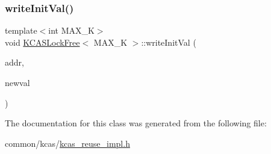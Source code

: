 \mbox{\label{classKCASLockFree_a3866dbd432d71b3d97338f6b0839d89b}} 
\subsubsection{\texorpdfstring{write\+Init\+Val()}{writeInitVal()}}
{\footnotesize\ttfamily template$<$int M\+A\+X\+\_\+K$>$ \\
void \hyperlink{classKCASLockFree}{K\+C\+A\+S\+Lock\+Free}$<$ M\+A\+X\+\_\+K $>$\+::write\+Init\+Val (\begin{DoxyParamCaption}\item[{\hyperlink{rq__unsafe_8h_ad45142aaf2ff20a036dc6242b8483e9c}{casword\+\_\+t} volatile $\ast$}]{addr,  }\item[{\hyperlink{rq__unsafe_8h_ad45142aaf2ff20a036dc6242b8483e9c}{casword\+\_\+t} const}]{newval }\end{DoxyParamCaption})}



The documentation for this class was generated from the following file\+:\begin{DoxyCompactItemize}
\item 
common/kcas/\hyperlink{kcas__reuse__impl_8h}{kcas\+\_\+reuse\+\_\+impl.\+h}\end{DoxyCompactItemize}
